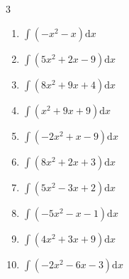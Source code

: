 \begin{multicols}{3}
\begin{enumerate}
\columnbreak %

  \item $\displaystyle \int \left( -x^{2}-x \right) \mathrm{d}x$


  \item $\displaystyle \int \left( 5x^{2}+2x-9 \right) \mathrm{d}x$


  \item $\displaystyle \int \left( 8x^{2}+9x+4 \right) \mathrm{d}x$


  \item $\displaystyle \int \left( x^{2}+9x+9 \right) \mathrm{d}x$


  \item $\displaystyle \int \left( -2x^{2}+x-9 \right) \mathrm{d}x$


  \item $\displaystyle \int \left( 8x^{2}+2x+3 \right) \mathrm{d}x$


  \item $\displaystyle \int \left( 5x^{2}-3x+2 \right) \mathrm{d}x$


  \item $\displaystyle \int \left( -5x^{2}-x-1 \right) \mathrm{d}x$


  \item $\displaystyle \int \left( 4x^{2}+3x+9 \right) \mathrm{d}x$


  \item $\displaystyle \int \left( -2x^{2}-6x-3 \right) \mathrm{d}x$



\end{enumerate}
\end{multicols}
